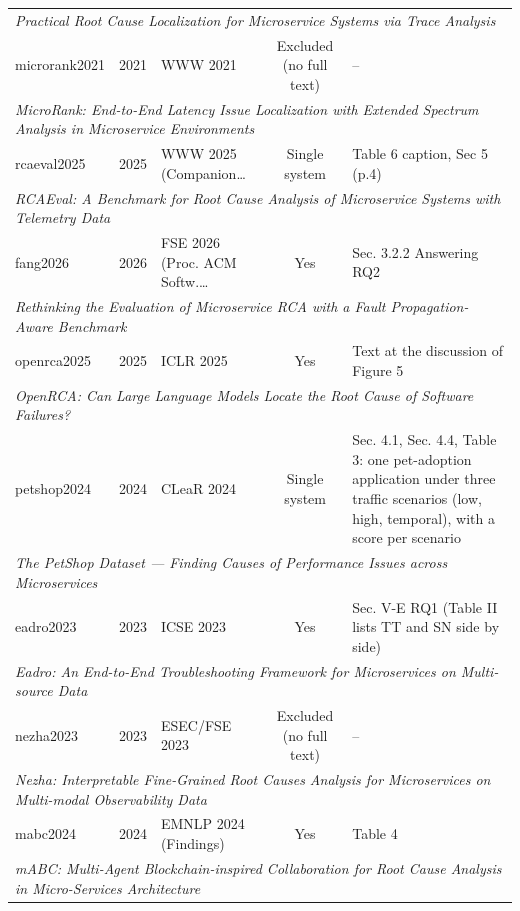 {\begin{longtable}{lllcp{5.2cm}}
\multicolumn{5}{l}{\scriptsize\textit{Practical Root Cause Localization for Microservice Systems via Trace Analysis}} \\
microrank2021 & 2021 & WWW 2021 & Excluded (no full text) & -- \\
\multicolumn{5}{l}{\scriptsize\textit{MicroRank: End-to-End Latency Issue Localization with Extended Spectrum Analysis in Microservice Environments}} \\
rcaeval2025 & 2025 & WWW 2025 (Companion\ldots & Single system & Table 6 caption, Sec 5 (p.4) \\
\multicolumn{5}{l}{\scriptsize\textit{RCAEval: A Benchmark for Root Cause Analysis of Microservice Systems with Telemetry Data}} \\
fang2026 & 2026 & FSE 2026 (Proc. ACM Softw.\ldots & Yes & Sec. 3.2.2 Answering RQ2 \\
\multicolumn{5}{l}{\scriptsize\textit{Rethinking the Evaluation of Microservice RCA with a Fault Propagation-Aware Benchmark}} \\
openrca2025 & 2025 & ICLR 2025 & Yes & Text at the discussion of Figure 5 \\
\multicolumn{5}{l}{\scriptsize\textit{OpenRCA: Can Large Language Models Locate the Root Cause of Software Failures?}} \\
petshop2024 & 2024 & CLeaR 2024 & Single system & Sec. 4.1, Sec. 4.4, Table 3: one pet-adoption application under three traffic scenarios (low, high, temporal), with a score per scenario \\
\multicolumn{5}{l}{\scriptsize\textit{The PetShop Dataset --- Finding Causes of Performance Issues across Microservices}} \\
eadro2023 & 2023 & ICSE 2023 & Yes & Sec. V-E RQ1 (Table II lists TT and SN side by side) \\
\multicolumn{5}{l}{\scriptsize\textit{Eadro: An End-to-End Troubleshooting Framework for Microservices on Multi-source Data}} \\
nezha2023 & 2023 & ESEC/FSE 2023 & Excluded (no full text) & -- \\
\multicolumn{5}{l}{\scriptsize\textit{Nezha: Interpretable Fine-Grained Root Causes Analysis for Microservices on Multi-modal Observability Data}} \\
mabc2024 & 2024 & EMNLP 2024 (Findings) & Yes & Table 4 \\
\multicolumn{5}{l}{\scriptsize\textit{mABC: Multi-Agent Blockchain-inspired Collaboration for Root Cause Analysis in Micro-Services Architecture}} \\

\end{longtable}}
